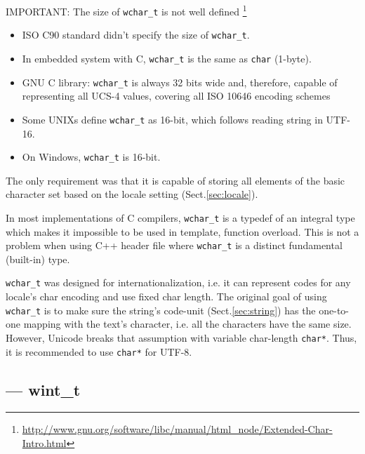 IMPORTANT: The size of \verb!wchar_t! is not well defined
\footnote{\url{http://www.gnu.org/software/libc/manual/html_node/Extended-Char-Intro.html}}
\begin{itemize}
  \item ISO C90 standard didn't specify the size of \verb!wchar_t!.

  \item  In embedded system with C, \verb!wchar_t! is the same as \verb!char!
  (1-byte).
  
  \item GNU C library: \verb!wchar_t! is always 32 bits wide and, therefore,
  capable of representing all UCS-4 values, covering all  ISO 10646 encoding
  schemes
  
  \item Some UNIXs define \verb!wchar_t! as 16-bit, which follows
  reading string in UTF-16.

  \item On Windows, \verb!wchar_t! is 16-bit.
  
\end{itemize}
The only requirement was that it is capable of storing all elements of the basic
character set based on the locale setting (Sect.\ref{sec:locale}). 



In most implementations of C compilers, \verb!wchar_t! is a typedef of an integral
type which makes it impossible to be used in template, function overload. 
This is not a problem when using C++ header file where \verb!wchar_t! is a
distinct fundamental (built-in) type.

\begin{mdframed}
\verb!wchar_t! was designed for internationalization, i.e. it can represent
codes for any locale's char encoding and use fixed char length. The original
goal of using \verb!wchar_t! is to make sure the string's code-unit
(Sect.\ref{sec:string}) has the one-to-one mapping with the text's character,
i.e. all the characters have the same size. However, Unicode breaks that
assumption with variable char-length \verb!char*!. Thus, it is recommended to
use \verb!char*! for UTF-8. 

\end{mdframed}

\subsection{--- wint\_t}
\label{sec:wint_t}

